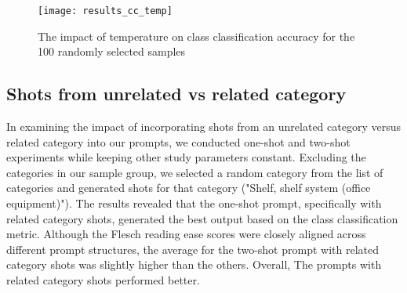 \begin{figure}[H]
	\centering
	\texttt{[image: results\_cc\_temp]}
	\caption{The impact of temperature on class classification accuracy for the 100 randomly selected samples}
	\label{fig:results_cc_temp}
\end{figure}

\subsection{Shots from unrelated vs related category}

In examining the impact of incorporating shots from an unrelated category versus related category into our prompts, we conducted one-shot and two-shot experiments while keeping other study parameters constant. Excluding the categories in our sample group, we selected a random category from the list of categories and generated shots for that category ("Shelf, shelf system (office equipment)"). The results revealed that the one-shot prompt, specifically with related category shots, generated the best output based on the class classification metric. Although the Flesch reading ease scores were closely aligned across different prompt structures, the average for the two-shot prompt with related category shots was slightly higher than the others. Overall, The prompts with related category shots performed better.


%		


